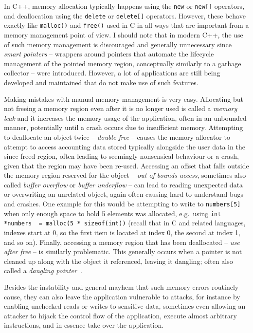 In C++, memory allocation typically happens using the \lstinline!new! or \lstinline!new[]! operators, and deallocation using the \lstinline!delete! or \lstinline!delete[]! operators. However, these behave exactly like \lstinline!malloc()! and \lstinline!free()! used in C in all ways that are important from a memory management point of view. I should note that in modern C++, the use of such memory management is discouraged and generally unnecessary since \emph{smart pointers} -- wrappers around pointers that automate the lifecycle management of the pointed memory region, conceptually similarly to a garbage collector -- were introduced. However, a lot of applications are still being developed and maintained that do not make use of such features.

Making mistakes with manual memory management is very easy. Allocating but not freeing a memory region even after it is no longer used is called a \emph{memory leak} and it increases the memory usage of the application, often in an unbounded manner, potentially until a crash occurs due to insufficient memory. Attempting to deallocate an object twice -- \emph{double free} -- causes the memory allocator to attempt to access accounting data stored typically alongside the user data in the since-freed region, often leading to seemingly nonsensical behaviour or a crash, given that the region may have been re-used. Accessing an offset that falls outside the memory region reserved for the object -- \emph{out-of-bounds access}, sometimes also called \emph{buffer overflow} or \emph{buffer underflow} -- can lead to reading unexpected data or overwriting an unrelated object, again often causing hard-to-understand bugs and crashes. One example for this would be attempting to write to \lstinline!numbers[5]! when only enough space to hold 5 elements was allocated, e.g.\ using \lstinline!int *numbers  = malloc(5 * sizeof(int))! (recall that in C and related languages, indexes start at 0, so the first item is located at index 0, the second at index 1, and so on). Finally, accessing a memory region that has been deallocated -- \emph{use after free} -- is similarly problematic. This generally occurs when a pointer is not cleaned up along with the object it referenced, leaving it dangling; often also called a \emph{dangling pointer}~\cite{dangling-ptr-smashing-webpdf}.

Besides the instability and general mayhem that such memory errors routinely cause, they can also leave the application vulnerable to attacks, for instance by enabling unchecked reads or writes to sensitive data, sometimes even allowing an attacker to hijack the control flow of the application, execute almost arbitrary instructions, and in essence take over the application.

